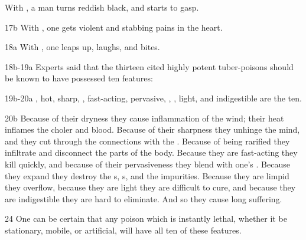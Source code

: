 \begin{translation}
    With
    , a man turns reddish black, and starts to gasp.
    \item[ 17b]
    With
    ,
    one gets violent  and stabbing pains in the heart.
    
    \item[ 18a]
    With
    , one leaps up, laughs, and bites.
    
    
    \item[ 18b-19a]
    Experts said that the thirteen cited highly potent tuber-poisons should be known to have possessed ten features:
    \item[ 19b-20a]
   , hot, sharp, ,
    fast-acting, pervasive, , ,
    light, and indigestible are the ten.    
    \item[ 20b]
    Because of their dryness they cause inflammation of the wind; their heat
    inflames the choler and blood. 
    Because of their sharpness they unhinge the
    mind, and they cut through the connections with the .  Because of being rarified they infiltrate and disconnect
    the parts of the body. Because they are fast-acting they kill quickly, and
    because of their pervasiveness they blend with one's .  Because they expand they destroy the
    s, s, and the
    impurities.  Because they are limpid they overflow,
    because they are light they are difficult to cure, and because they are
    indigestible they are hard to eliminate.  And so they cause long suffering.
    
    \item[ 24]
    One can be certain that any poison which is instantly lethal, whether it be
    stationary, mobile, or artificial, will have all ten of these features.
    

\end{translation}
